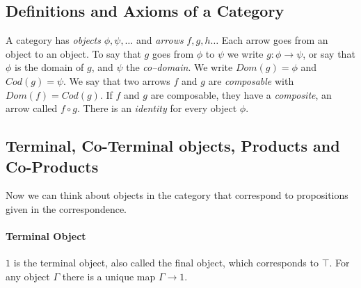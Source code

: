 \subsection{Definitions and Axioms of a Category}
A category has \emph{objects} $\phi,\psi, \ldots$ and \emph{arrows} $f,g,h\ldots$ Each arrow goes from an object to an object. To say that $g$ goes from $\phi$ to $\psi$ we write $g:\phi\rightarrow\psi$, or say that $\phi$ is the domain of $g$, and $\psi$ the \emph{co--domain}. We write $Dom(g)=\phi$ and $Cod(g)=\psi$.
We say that two arrows $f$ and $g$ are \emph{composable} with $Dom(f)=Cod(g)$. If $f$ and $g$ are composable, they have a \emph{composite}, an arrow called $f\circ g$. There is an \emph{identity} for every object $\phi$.
\begin{mdframed}
\end{mdframed}



\subsection{Terminal, Co-Terminal objects, Products and Co-Products}
Now we can think about objects in the category that correspond to propositions given in the correspondence.

\paragraph{Terminal Object}
$1$ is the terminal object, also called the final object, which corresponds to $\top$. For any object $\Gamma$ there is a unique map $\Gamma\to 1$. 
\begin{mdframed}
\end{mdframed}



